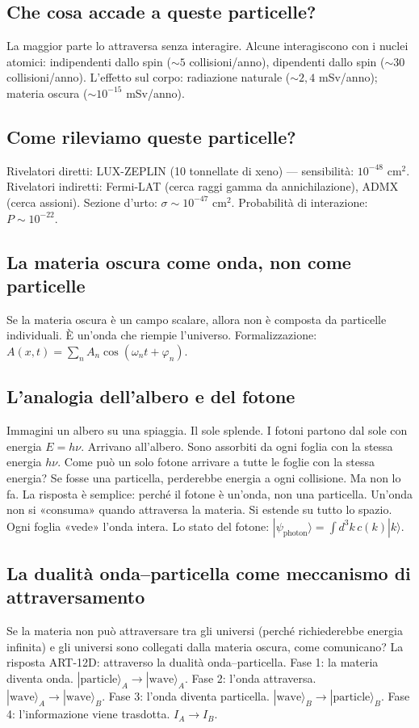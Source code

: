 \subsection{Che cosa accade a queste particelle?}
La maggior parte lo attraversa senza interagire. Alcune interagiscono con i nuclei atomici: indipendenti dallo spin ($\sim 5$ collisioni/anno), dipendenti dallo spin ($\sim 30$ collisioni/anno). L'effetto sul corpo: radiazione naturale ($\sim 2,4$ mSv/anno); materia oscura ($\sim 10^{-15}$ mSv/anno).

\subsection{Come rileviamo queste particelle?}
Rivelatori diretti: LUX-ZEPLIN (10 tonnellate di xeno) --- sensibilità: $10^{-48}$ cm$^2$. Rivelatori indiretti: Fermi-LAT (cerca raggi gamma da annichilazione), ADMX (cerca assioni). Sezione d'urto: $\sigma \sim 10^{-47}$ cm$^2$. Probabilità di interazione: $P \sim 10^{-22}$.

\subsection{La materia oscura come onda, non come particelle}
Se la materia oscura è un campo scalare, allora non è composta da particelle individuali. È un'onda che riempie l'universo. Formalizzazione: $A(x,t) = \sum_n A_n \cos(\omega_n t + \varphi_n)$.

\subsection{L'analogia dell'albero e del fotone}
Immagini un albero su una spiaggia. Il sole splende. I fotoni partono dal sole con energia $E = h\nu$. Arrivano all'albero. Sono assorbiti da ogni foglia con la stessa energia $h\nu$. Come può un solo fotone arrivare a tutte le foglie con la stessa energia? Se fosse una particella, perderebbe energia a ogni collisione. Ma non lo fa. La risposta è semplice: perché il fotone è un'onda, non una particella. Un'onda non si «consuma» quando attraversa la materia. Si estende su tutto lo spazio. Ogni foglia «vede» l'onda intera. Lo stato del fotone: $|\psi_{\text{photon}}\rangle = \int d^3k \, c(k) |k\rangle$.

\subsection{La dualità onda--particella come meccanismo di attraversamento}
Se la materia non può attraversare tra gli universi (perché richiederebbe energia infinita) e gli universi sono collegati dalla materia oscura, come comunicano? La risposta ART-12D: attraverso la dualità onda--particella. Fase 1: la materia diventa onda. $|\text{particle}\rangle_A \to |\text{wave}\rangle_A$. Fase 2: l'onda attraversa. $|\text{wave}\rangle_A \to |\text{wave}\rangle_B$. Fase 3: l'onda diventa particella. $|\text{wave}\rangle_B \to |\text{particle}\rangle_B$. Fase 4: l'informazione viene trasdotta. $I_A \to I_B$.

